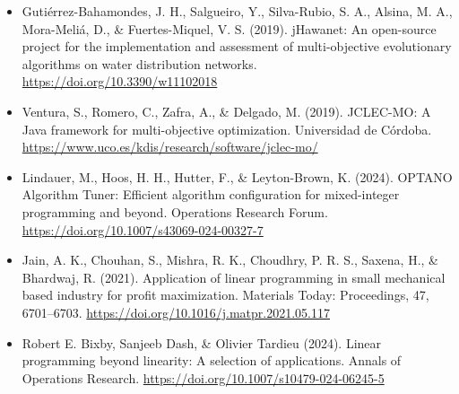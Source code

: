 \documentclass[12pt,a4paper]{article}
\begin{document}
\begin{itemize}[leftmargin=*]
	\item Gutiérrez-Bahamondes, J. H., Salgueiro, Y., Silva-Rubio, S. A., Alsina, M. A., Mora-Meliá, D., \& Fuertes-Miquel, V. S. (2019). jHawanet: An open-source project for the implementation and assessment of multi-objective evolutionary algorithms on water distribution networks. \url{https://doi.org/10.3390/w11102018}
	\item Ventura, S., Romero, C., Zafra, A., \& Delgado, M. (2019). JCLEC-MO: A Java framework for multi-objective optimization. Universidad de Córdoba. \url{https://www.uco.es/kdis/research/software/jclec-mo/}
	\item Lindauer, M., Hoos, H. H., Hutter, F., \& Leyton-Brown, K. (2024). OPTANO Algorithm Tuner: Efficient algorithm configuration for mixed-integer programming and beyond. Operations Research Forum. \url{https://doi.org/10.1007/s43069-024-00327-7}
	\item Jain, A. K., Chouhan, S., Mishra, R. K., Choudhry, P. R. S., Saxena, H., \& Bhardwaj, R. (2021). Application of linear programming in small mechanical based industry for profit maximization. Materials Today: Proceedings, 47, 6701--6703. \url{https://doi.org/10.1016/j.matpr.2021.05.117}
	\item Robert E. Bixby, Sanjeeb Dash, \& Olivier Tardieu (2024). Linear programming beyond linearity: A selection of applications. Annals of Operations Research. \url{https://doi.org/10.1007/s10479-024-06245-5}
\end{itemize}
\end{document}
